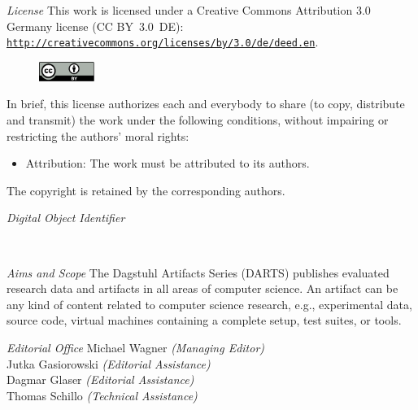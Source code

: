 \documentclass[a4paper,UKenglish]{dartsmaster-v2019}
\begin{document}
\begin{publicationinfo}
\emph{License}\newline
This work is licensed under a Creative Commons Attribution 3.0 Germany license (CC BY~3.0~DE): \href{http://creativecommons.org/licenses/by/3.0/de/deed.en}{\nolinkurl{http://creativecommons.org/licenses/by/}}\linebreak \href{http://creativecommons.org/licenses/by/3.0/de/deed.en}{\nolinkurl{3.0/de/deed.en}}.
\begin{figure}
\vspace*{-1\baselineskip}
\includegraphics[width=1.8cm]{cc-by}
\end{figure}
In brief, this license authorizes each and everybody to share (to
copy, distribute and transmit) the work under the following
conditions, without impairing or restricting the authors'
moral rights:
\begin{itemize}
\item Attribution: The work must be attributed to its authors.
\end{itemize}

The copyright is retained by the corresponding authors.

\vfill
\emph{Digital Object Identifier}\newline
\printForewordDOI

\newpage

~~

\bigskip

\emph{Aims and Scope}\newline
The Dagstuhl Artifacts Series (DARTS) publishes evaluated research data and artifacts in all areas of computer science. An artifact can be any kind of content related to computer science research, e.g., experimental data, source code, virtual machines containing a complete setup, test suites, or tools.



\vfill


\emph{Editorial Office}\newline
Michael Wagner \emph{(Managing Editor)}\\
Jutka Gasiorowski \emph{(Editorial Assistance)}\\
Dagmar Glaser \emph{(Editorial Assistance)}\\
Thomas Schillo \emph{(Technical Assistance)}


\end{publicationinfo}
\end{document}
